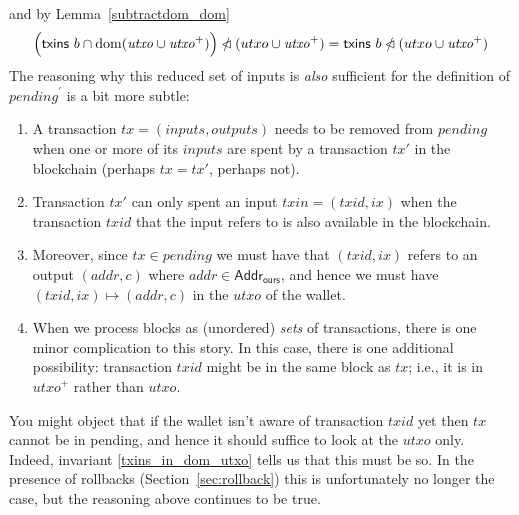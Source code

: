 \documentclass{article}
\DeclareMathOperator{\dom}{dom}
\newcommand{\restrictdom}{\lhd}
\newcommand{\subtractdom}{\mathbin{\slashed{\restrictdom}}}
\begin{document}
%
and by Lemma~\ref{subtractdom_dom}
%
\begin{equation*}
  \Bigl( \mathsf{txins} ~ b \cap \dom (\mathit{utxo} \cup \mathit{utxo}^+) \Bigr) \subtractdom (utxo \cup \mathit{utxo}^+) \\
= \mathsf{txins} ~ b \subtractdom (utxo \cup \mathit{utxo}^+)
\end{equation*}
%
The reasoning why this reduced set of inputs is \emph{also} sufficient for
the definition of $\mathit{pending}^\prime$ is a bit more subtle:
%
\begin{enumerate}

\item A transaction $\mathit{tx} = (\mathit{inputs}, \mathit{outputs})$ needs to
be removed from $\mathit{pending}$ when one or more of its $\mathit{inputs}$ are
spent by a transaction $\mathit{tx}'$ in the blockchain (perhaps $\mathit{tx} =
\mathit{tx}'$, perhaps not).

\item Transaction $\mathit{tx}'$ can only spent an input $\mathit{\mathit{txin}} =
(\mathit{\mathit{txid}}, ix)$ when the transaction $\mathit{\mathit{txid}}$ that
the input refers to is also available in the blockchain.

\item Moreover, since $\mathit{tx} \in \mathit{pending}$ we must have that
$(\mathit{\mathit{txid}}, ix)$ refers to an output $(\mathit{addr}, c)$
where $\mathit{addr} \in \mathsf{Addr}_\mathsf{ours}$, and hence we must have
$(\mathit{\mathit{txid}}, ix) \mapsto (\mathit{addr}, c)$ in the
$\mathit{\mathit{utxo}}$ of the wallet.

\item When we process blocks as (unordered) \emph{sets} of transactions, there is
one minor complication to this story. In this case, there is one additional
possibility: transaction $\mathit{\mathit{txid}}$ might be in the same block as
$\mathit{tx}$; i.e., it is in $\mathit{utxo}^+$ rather than $\mathit{utxo}$.

\end{enumerate}

You might object that if the wallet isn't aware of transaction
$\mathit{\mathit{txid}}$ yet then $\mathit{tx}$ cannot be in pending, and hence
it should suffice to look at the $\mathit{utxo}$ only. Indeed, invariant
\eqref{txins_in_dom_utxo} tells us that this must be so. In the presence of
rollbacks (Section~\ref{sec:rollback}) this is unfortunately no longer the case,
but the reasoning above continues to be true.
\end{document}
